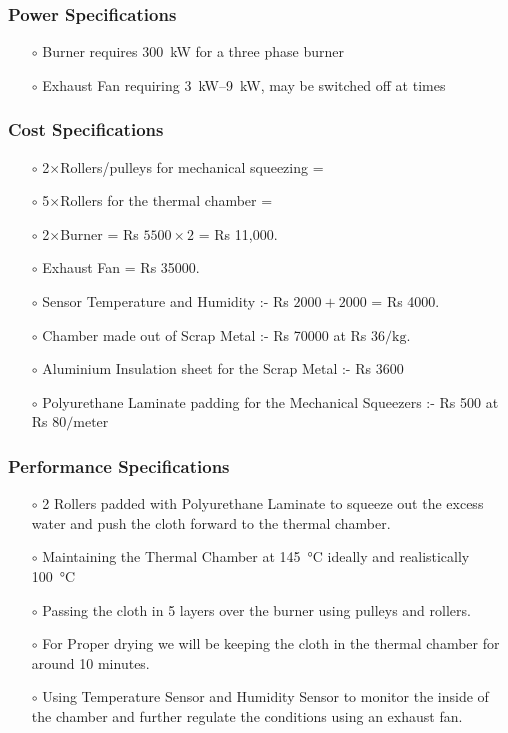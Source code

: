 \documentclass[12pt]{article}
\begin{document}
\subsubsection{Power Specifications}
\begin{itemize}
    \item[$\scriptstyle\circ$]Burner requires \SI{300}{\kilo\watt} for a three phase burner
    \item[$\scriptstyle\circ$]Exhaust Fan requiring \SIrange{3}{9}{\kilo\watt}, may be switched off at times
\end{itemize}

\subsubsection{Cost Specifications}
\begin{itemize}
    \item[$\scriptstyle\circ$]2$\times$Rollers/pulleys for mechanical squeezing =
    \item[$\scriptstyle\circ$]5$\times$Rollers for the thermal chamber =
    \item[$\scriptstyle\circ$]2$\times$Burner = Rs $5500\times2$ = Rs 11,000. 
    \item[$\scriptstyle\circ$]Exhaust Fan = Rs 35000.
    \item[$\scriptstyle\circ$]Sensor Temperature and Humidity :- Rs $2000 + 2000$ = Rs 4000.
    \item[$\scriptstyle\circ$]	Chamber made out of Scrap Metal :- Rs 70000 at Rs \(36/\text{kg}\).
    \item[$\scriptstyle\circ$] Aluminium Insulation sheet for the Scrap Metal :- Rs 3600
    \item[$\scriptstyle\circ$] \Gls{Polyurethane Laminate} padding for the Mechanical Squeezers :- Rs 500 at Rs \(80/\text{meter}\)
\end{itemize}


\subsubsection{Performance Specifications}
\begin{itemize}
    \item[$\scriptstyle\circ$]	2 Rollers padded with Polyurethane Laminate to squeeze out the excess water and push the cloth forward to the thermal chamber.
    \item[$\scriptstyle\circ$] Maintaining the Thermal Chamber at \SI{145}{\degreeCelsius} ideally and realistically \SI{100}{\degreeCelsius}
    \item[$\scriptstyle\circ$] Passing the cloth in 5 layers over the burner using pulleys and rollers.
    \item[$\scriptstyle\circ$] For Proper drying we will be keeping the cloth in the thermal chamber for around 10 minutes.
    \item[$\scriptstyle\circ$] Using Temperature Sensor and Humidity Sensor to monitor the inside of the chamber and further regulate the conditions using an exhaust fan. \cite{dryden_chapter_1982} \cite{noauthor_drying_nodate} \cite{noauthor_dry_nodate}
\end{itemize}
\end{document}
